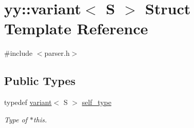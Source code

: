 \hypertarget{structyy_1_1variant}{}\section{yy\+:\+:variant$<$ S $>$ Struct Template Reference}
\label{structyy_1_1variant}


{\ttfamily \#include $<$parser.\+h$>$}

\subsection*{Public Types}
\begin{DoxyCompactItemize}
\item 
\hypertarget{structyy_1_1variant_afbd75aee339bd9fa06e6fa8f320cecd3}{}typedef \hyperlink{structyy_1_1variant}{variant}$<$ S $>$ \hyperlink{structyy_1_1variant_afbd75aee339bd9fa06e6fa8f320cecd3}{self\+\_\+type}\label{structyy_1_1variant_afbd75aee339bd9fa06e6fa8f320cecd3}

\begin{DoxyCompactList}\small\item\em Type of $\ast$this. \end{DoxyCompactList}\end{DoxyCompactItemize}
